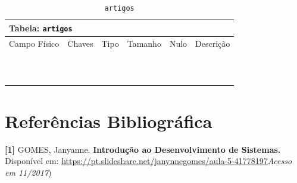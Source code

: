 \documentclass[12pt,a4paper]{article}
\begin{document}
\begin{center}
\begin{table}[h!]
	\caption{\texttt{artigos}}
	\label{tabela:artigos}
	\begin{tabular}{|p{2.5cm}|p{1cm}|p{1.25cm}|p{1.75cm}|p{1.25cm}|p{5cm}|}\hline	
		\multicolumn{6}{|p{16cm}|}{\cellcolor{cinzaClaro}  \centering Tabela: \texttt{artigos}} \\ \hline %
		{\small Campo Físico}   & {\small Chaves} & {\small Tipo} & {\small Tamanho} & {\small Nulo} & {\small Descrição}\\\hline %
		
		{\tiny } & {\tiny } & {\tiny } & {\tiny } & {\tiny } &{\tiny }\\\hline
		{\tiny } & {\tiny } & {\tiny } & {\tiny } & {\tiny } &{\tiny }\\\hline
		{\tiny } & {\tiny } & {\tiny } & {\tiny } & {\tiny } &{\tiny }\\\hline
		{\tiny } & {\tiny } & {\tiny } & {\tiny } & {\tiny } &{\tiny }\\\hline
		{\tiny } & {\tiny } & {\tiny } & {\tiny } & {\tiny } &{\tiny }\\\hline
		{\tiny } & {\tiny } & {\tiny } & {\tiny } & {\tiny } &{\tiny }\\\hline
		{\tiny } & {\tiny } & {\tiny } & {\tiny } & {\tiny } &{\tiny }\\\hline
		{\tiny } & {\tiny } & {\tiny } & {\tiny } & {\tiny } &{\tiny }\\\hline
		{\tiny } & {\tiny } & {\tiny } & {\tiny } & {\tiny } &{\tiny }\\\hline
		{\tiny } & {\tiny } & {\tiny } & {\tiny } & {\tiny } &{\tiny }\\\hline
		{\tiny } & {\tiny } & {\tiny } & {\tiny } & {\tiny } &{\tiny }\\\hline
			
	\end{tabular}
\end{table}	
\end{center}

\newpage
\section{Referências Bibliográfica}
\noindent \textbf{[1]} GOMES, Janyanne. \textbf{Introdução ao Desenvolvimento de Sistemas.} Disponível em: \url {https://pt.slideshare.net/janynnegomes/aula-5-41778197}\textit{Acesso em 11/2017})\\\vspace{0.2cm}
\end{document}
